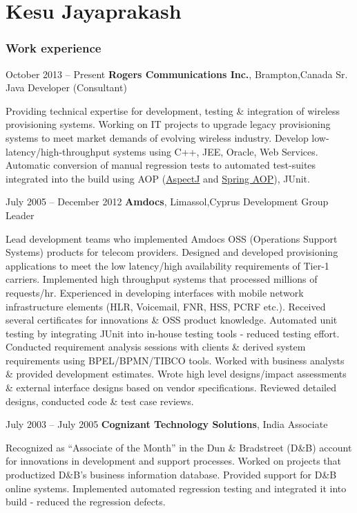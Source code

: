 \documentclass{tccv}
\begin{document}
\part{Kesu Jayaprakash}

\section{Work experience}

\begin{eventlist}

\item{October 2013 -- Present}
     {\textbf{Rogers Communications Inc.}, Brampton,Canada}
     {Sr. Java Developer (Consultant)}

Providing technical expertise for development, testing \& integration of wireless provisioning systems. Working on IT projects to upgrade legacy provisioning systems to meet market demands of evolving wireless industry. Develop low-latency/high-throughput systems using C++, JEE, Oracle, Web Services. Automatic conversion of manual regression tests to automated test-suites integrated into the build using AOP (\href{https://eclipse.org/aspectj/}{AspectJ} and \href{http://docs.spring.io/spring/docs/current/spring-framework-reference/html/aop.html}{Spring AOP}), JUnit.

\item{July 2005 -- December 2012}
     {\textbf{Amdocs}, Limassol,Cyprus}
     {Development Group Leader}

Lead development teams who implemented Amdocs OSS (Operations Support Systems) products for  telecom providers. Designed and developed provisioning applications to meet the low latency/high availability requirements of Tier-1 carriers. Implemented high throughput systems that processed millions of requests/hr. Experienced in developing interfaces with mobile network infrastructure elements (HLR, Voicemail, FNR, HSS, PCRF etc.). Received several certificates for innovations \& OSS product knowledge. Automated unit testing by integrating JUnit into in-house testing tools - reduced testing effort. Conducted requirement analysis sessions with clients \& derived system requirements using BPEL/BPMN/TIBCO tools. Worked with business analysts \& provided development estimates. Wrote high level designs/impact assessments \& external interface designs based on vendor specifications. Reviewed detailed designs, conducted code \& test case reviews. 

\item{July 2003 -- July 2005}
     {\textbf{Cognizant Technology Solutions}, India}
     {Associate}

Recognized as ``Associate of the Month'' in the Dun \& Bradstreet (D\&B) account for innovations in development and support processes. Worked on projects that productized D\&B's business information database. Provided support for D\&B online systems. Implemented automated regression testing and integrated it into build - reduced the regression defects.


\end{eventlist}
\end{document}
